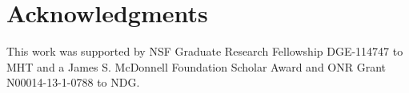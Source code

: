 \documentclass[10pt,letterpaper]{article}
\newcommand{\red}[1]{\textcolor{Red}{#1}}
\begin{document}
%



\section{Acknowledgments}

This work was supported by NSF Graduate Research Fellowship DGE-114747 to MHT and a James S. McDonnell Foundation Scholar Award  and ONR Grant N00014-13-1-0788 to NDG.



\setlength{\bibleftmargin}{.125in}
\setlength{\bibindent}{-\bibleftmargin}
\vspace{-1.5ex}


\end{document}
